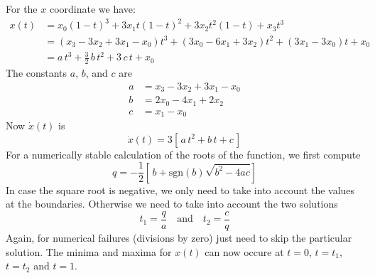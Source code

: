 \documentclass{article}
\begin{document}
For the $x$ coordinate we have:
\begin{align}
  x(t) & = x_0(1-t)^3 + 3x_1t(1-t)^2 + 3x_2t^2(1-t) + x_3 t^3\\
       & = (x_3-3x_2+3x_1-x_0)t^3 + (3x_0-6x_1+3x_2)t^2 + (3x_1-3x_0)t + x_0\\
       & = a\,t^3 + \frac{3}{2}\,b\,t^2 + 3\,c\,t + x_0
\end{align}
%
The constants $a$, $b$, and $c$ are
%
\begin{align}
  a & = x_3-3x_2+3x_1-x_0 \\
  b & = 2x_0-4x_1+2x_2 \\
  c & = x_1-x_0
\end{align}
%
Now $\dot x(t)$ is
%
\begin{equation}
  \dot x(t) = 3\left[\,a\,t^2 + b\,t + c\,\right]
\end{equation}
%
For a numerically stable calculation of the roots of the function, we
first compute
%
\begin{equation}
  q = -\frac{1}{2}\left[\,b+\mathrm{sgn}(b)\sqrt{b^2-4ac}\right]
\end{equation}
%
In case the square root is negative, we only need to take into account
the values at the boundaries. Otherwise we need to take into account
the two solutions
%
\begin{equation}
  t_1 = \frac{q}{a} \quad\text{and}\quad t_2 = \frac{c}{q}
\end{equation}
%
Again, for numerical failures (divisions by zero) just need to skip
the particular solution. The minima and maxima for $x(t)$ can now
occure at $t=0$, $t=t_1$, $t=t_2$ and $t=1$.
\end{document}
